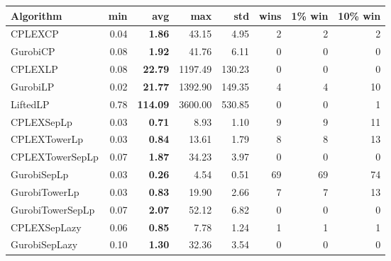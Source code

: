 \begin{tabular}{lrrrrrrr}
Algorithm & min & avg & max & std
& wins & 1\% win & 10\% win 
\\
\hline
CPLEXCP&0.04& \bf1.86& 43.15& 4.95&2&2&2\\
GurobiCP&0.08& \bf1.92& 41.76& 6.11&0&0&0\\
CPLEXLP&0.08& \bf22.79& 1197.49& 130.23&0&0&0\\
GurobiLP&0.02& \bf21.77& 1392.90& 149.35&4&4&10\\
LiftedLP&0.78& \bf114.09& 3600.00& 530.85&0&0&1\\
CPLEXSepLp&0.03& \bf0.71& 8.93& 1.10&9&9&11\\
CPLEXTowerLp&0.03& \bf0.84& 13.61& 1.79&8&8&13\\
CPLEXTowerSepLp&0.07& \bf1.87& 34.23& 3.97&0&0&0\\
GurobiSepLp&0.03& \bf0.26& 4.54& 0.51&69&69&74\\
GurobiTowerLp&0.03& \bf0.83& 19.90& 2.66&7&7&13\\
GurobiTowerSepLp&0.07& \bf2.07& 52.12& 6.82&0&0&0\\
CPLEXSepLazy&0.06& \bf0.85& 7.78& 1.24&1&1&1\\
GurobiSepLazy&0.10& \bf1.30& 32.36& 3.54&0&0&0
\end{tabular}
